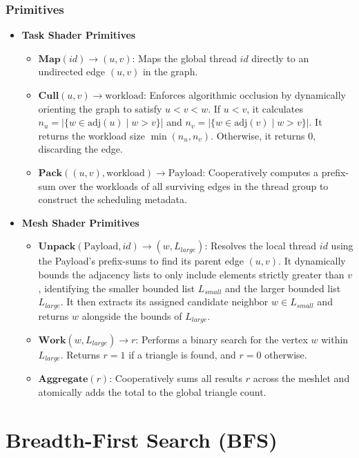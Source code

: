 \documentclass[11pt, a4paper]{article}
\begin{document}
\subsubsection{Primitives}

\begin{itemize}
    \item \textbf{Task Shader Primitives}
    \begin{itemize}
        \item $\textbf{Map}(id) \rightarrow (u, v)$: Maps the global thread $id$ directly to an undirected edge $(u, v)$ in the graph.
        \item $\textbf{Cull}(u, v) \rightarrow \text{workload}$: Enforces algorithmic occlusion by dynamically orienting the graph to satisfy $u < v < w$. If $u < v$, it calculates $n_u = |\{w \in \text{adj}(u) \mid w > v\}|$ and $n_v = |\{w \in \text{adj}(v) \mid w > v\}|$. It returns the workload size $\min(n_u, n_v)$. Otherwise, it returns $0$, discarding the edge.
        \item $\textbf{Pack}((u, v), \text{workload}) \rightarrow \text{Payload}$: Cooperatively computes a prefix-sum over the workloads of all surviving edges in the thread group to construct the scheduling metadata.
    \end{itemize}
    \item \textbf{Mesh Shader Primitives}
    \begin{itemize}
        \item $\textbf{Unpack}(\text{Payload}, id) \rightarrow (w, L_{large})$: Resolves the local thread $id$ using the Payload's prefix-sums to find its parent edge $(u, v)$. It dynamically bounds the adjacency lists to only include elements strictly greater than $v$, identifying the smaller bounded list $L_{small}$ and the larger bounded list $L_{large}$. It then extracts its assigned candidate neighbor $w \in L_{small}$ and returns $w$ alongside the bounds of $L_{large}$.
        \item $\textbf{Work}(w, L_{large}) \rightarrow r$: Performs a binary search for the vertex $w$ within $L_{large}$. Returns $r=1$ if a triangle is found, and $r=0$ otherwise.
        \item $\textbf{Aggregate}(r)$: Cooperatively sums all results $r$ across the meshlet and atomically adds the total to the global triangle count.
    \end{itemize}
\end{itemize}

\section{Breadth-First Search (BFS)}
\end{document}
